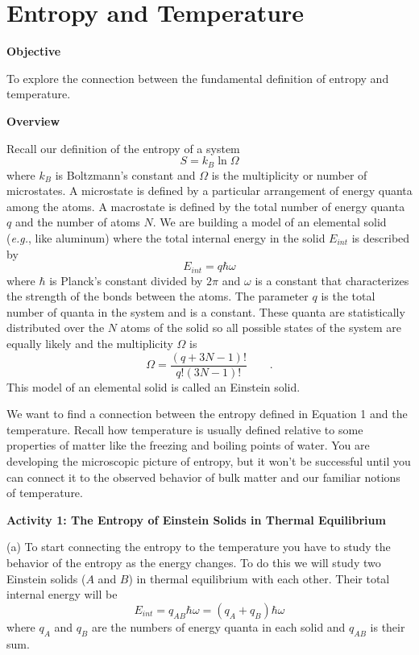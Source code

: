 \section{Entropy and Temperature}

\makelabheader %

\textbf{Objective}

To explore the connection between the fundamental definition of entropy and
temperature.

\textbf{Overview}

Recall our definition of the entropy of a system
\begin{equation}
S = k_B \ln \Omega
\end{equation}
where $k_B$ is Boltzmann's constant and $\Omega$ is the multiplicity or number of 
microstates.
A microstate is defined by a particular arrangement of energy quanta among the
atoms.
A macrostate is defined by the total number of energy quanta $q$ and the number of atoms $N$.
We are building a model of an elemental solid ({\it e.g.}, like aluminum)
where
the total internal energy in the solid $E_{int}$ is described by
\begin{equation}
E_{int} = q \hbar \omega 
\end{equation}
where $\hbar$ is Planck's constant divided by $2\pi$ and $\omega$ is a constant that
characterizes the strength of the bonds between the atoms.
The parameter 
$q$ is the total number of quanta in the system and is a constant.
These quanta are statistically distributed over the $N$ atoms of the solid so
all possible states of the system are equally likely and the multiplicity $\Omega$
is
\begin{equation}
\Omega = \frac{(q+3N-1)!}{q!(3N-1)!} \qquad .
\end{equation}
This model of an elemental solid is called an Einstein solid.

We want to find a connection between the entropy defined in Equation 1 and the
temperature.
Recall how temperature is usually defined
relative to some properties of matter like the freezing and 
boiling points of water.
You are developing the microscopic picture of entropy, but it won't be successful until
you can connect it to the observed behavior of bulk matter and our familiar notions of 
temperature.

\textbf{Activity 1: The Entropy of Einstein Solids in Thermal Equilibrium}

(a) To start connecting the entropy to the temperature you have to study the 
behavior of the entropy as the energy changes.
To do this we will study two Einstein solids ($A$ and $B$) in thermal equilibrium with 
each other.
Their total internal energy will be
\begin{equation}
E_{int} = q_{AB}\hbar \omega = (q_A + q_B) \hbar \omega
\end{equation}
where $q_A$ and $q_B$ are the numbers of energy quanta in each solid and $q_{AB}$ is 
their sum.

